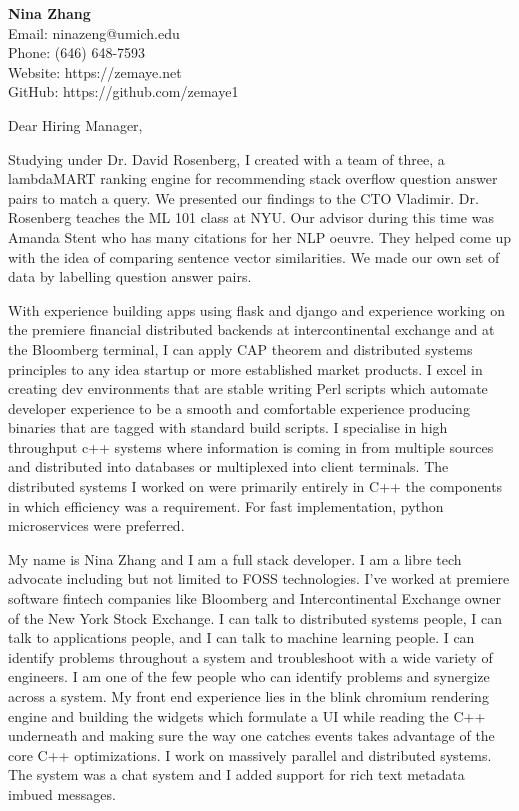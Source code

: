 \documentclass[11pt,a4paper]{article}
\begin{document}
\begin{center}
\textbf{Nina Zhang}\\
Email: ninazeng@umich.edu\\
Phone: (646) 648-7593\\
Website: https://zemaye.net\\
GitHub: https://github.com/zemaye1
\end{center}

\vspace{0.5in}

Dear Hiring Manager,

\vspace{0.3in}

Studying under Dr. David Rosenberg, I created with a team of three, a lambdaMART ranking engine for recommending stack overflow question answer pairs to match a query. We presented our findings to the CTO Vladimir. Dr. Rosenberg teaches the ML 101 class at NYU. Our advisor during this time was Amanda Stent who has many citations for her NLP oeuvre. They helped come up with the idea of comparing sentence vector similarities. We made our own set of data by labelling question answer pairs.

\vspace{0.2in}

With experience building apps using flask and django and experience working on the premiere financial distributed backends at intercontinental exchange and at the Bloomberg terminal, I can apply CAP theorem and distributed systems principles to any idea startup or more established market products. I excel in creating dev environments that are stable writing Perl scripts which automate developer experience to be a smooth and comfortable experience producing binaries that are tagged with standard build scripts. I specialise in high throughput c++ systems where information is coming in from multiple sources and distributed into databases or multiplexed into client terminals. The distributed systems I worked on were primarily entirely in C++ the components in which efficiency was a requirement. For fast implementation, python microservices were preferred.

\vspace{0.2in}

My name is Nina Zhang and I am a full stack developer. I am a libre tech advocate including but not limited to FOSS technologies. I've worked at premiere software fintech companies like Bloomberg and Intercontinental Exchange owner of the New York Stock Exchange. I can talk to distributed systems people, I can talk to applications people, and I can talk to machine learning people. I can identify problems throughout a system and troubleshoot with a wide variety of engineers. I am one of the few people who can identify problems and synergize across a system. My front end experience lies in the blink chromium rendering engine and building the widgets which formulate a UI while reading the C++ underneath and making sure the way one catches events takes advantage of the core C++ optimizations. I work on massively parallel and distributed systems. The system was a chat system and I added support for rich text metadata imbued messages.
\end{document}
